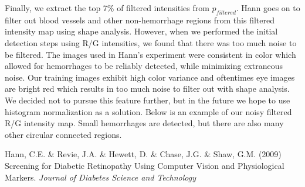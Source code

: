 \documentclass{article} %
\begin{document}
Finally, we extract the top 7\% of filtered intensities from $p_{filtered}$. Hann goes on to filter out blood vessels and other non-hemorrhage regions from this filtered intensity map using shape analysis. However, when we performed the initial detection steps using R/G intensities, we found that there was too much noise to be filtered. The images used in Hann's experiment were consistent in color which allowed for hemorrhages to be reliably detected, while minimizing extraneous noise. Our training images exhibit high color variance and oftentimes eye images are bright red which results in too much noise to filter out with shape analysis. We decided not to pursue this feature further, but in the future we hope to use histogram normalization as a solution. Below is an example of our noisy filtered R/G intensity map. Small hemorrhages are detected, but there are also many other circular connected regions.

\begin{figure}[htp]
  \centering
  \quad
\end{figure}

\begin{thebibliography}{9}
Hann, C.E. \& Revie, J.A. \& Hewett, D. \& Chase, J.G. \& Shaw, G.M.
(2009) Screening for Diabetic Retinopathy Using Computer Vision and Physiological Markers. 
{\it Journal of Diabetes Science and Technology}
\end{thebibliography}
\end{document}

